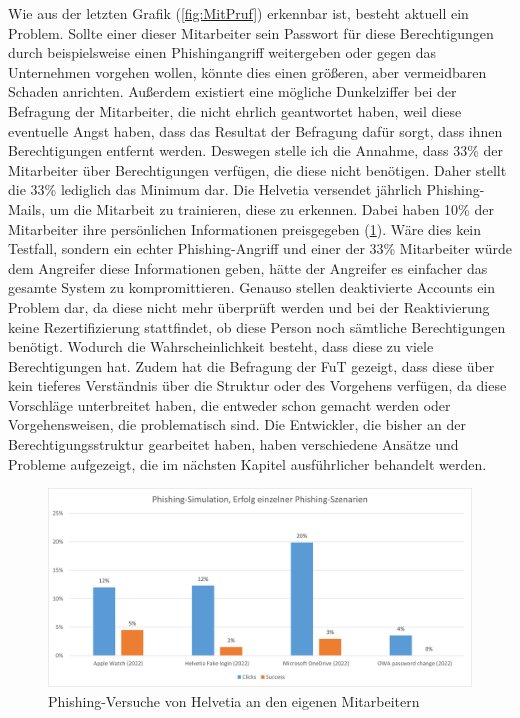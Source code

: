 Wie aus der letzten Grafik (\ref{fig:MitPruf}) erkennbar ist, besteht aktuell ein Problem.
Sollte einer dieser Mitarbeiter sein Passwort für diese Berechtigungen durch beispielsweise einen Phishingangriff weitergeben oder gegen das Unternehmen vorgehen wollen, könnte dies einen größeren, aber vermeidbaren Schaden anrichten.
Außerdem existiert eine mögliche Dunkelziffer bei der Befragung der Mitarbeiter, die nicht ehrlich geantwortet haben, weil diese eventuelle Angst haben, dass das Resultat der Befragung dafür sorgt, dass ihnen Berechtigungen entfernt werden.
Deswegen stelle ich die Annahme, dass 33\% der Mitarbeiter über Berechtigungen verfügen, die diese nicht benötigen.
Daher stellt die 33\% lediglich das Minimum dar.
Die Helvetia versendet jährlich Phishing-Mails, um die Mitarbeit zu trainieren, diese zu erkennen.
Dabei haben 10\% der Mitarbeiter ihre persönlichen Informationen preisgegeben (\ref{fig:Bef}).
Wäre dies kein Testfall, sondern ein echter Phishing-Angriff und einer der 33\% Mitarbeiter würde dem Angreifer diese Informationen geben, hätte der Angreifer es einfacher das gesamte System zu kompromittieren.
\newline
\newline
Genauso stellen deaktivierte Accounts ein Problem dar, da diese nicht mehr überprüft werden und bei der Reaktivierung keine Rezertifizierung stattfindet, ob diese Person noch sämtliche Berechtigungen benötigt.
Wodurch die Wahrscheinlichkeit besteht, dass diese zu viele Berechtigungen hat.
Zudem hat die Befragung der \ac{FuT} gezeigt, dass diese über kein tieferes Verständnis über die Struktur oder des Vorgehens verfügen, da diese Vorschläge unterbreitet haben, die entweder schon gemacht werden oder Vorgehensweisen, die problematisch sind.
Die Entwickler, die bisher an der Berechtigungsstruktur gearbeitet haben, haben verschiedene Ansätze und Probleme aufgezeigt, die im nächsten Kapitel ausführlicher behandelt werden.
\begin{figure}[h!]
 \centering
 \includegraphics[width=1\textwidth]{gfx/Picture/Befragung.PNG}
 \caption{Phishing-Versuche von Helvetia an den eigenen Mitarbeitern \cite{Helvetia}}
 \label{fig:Bef}
\end{figure}

